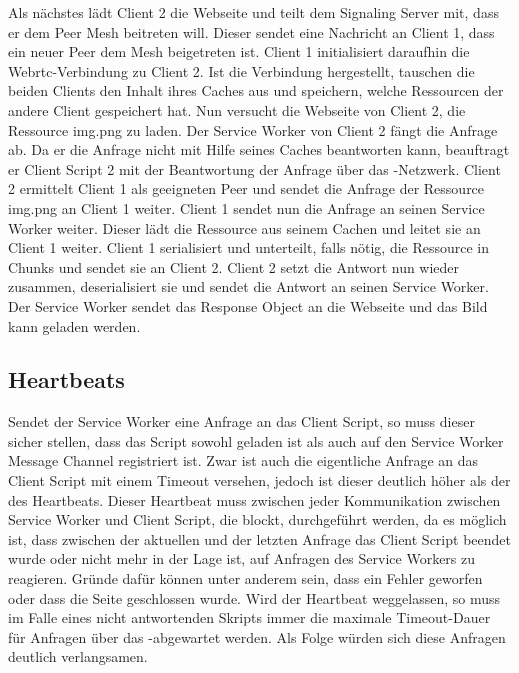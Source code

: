 \begin{description}
Als nächstes lädt Client 2 die Webseite und teilt dem Signaling Server mit, dass er dem Peer Mesh beitreten will. Dieser sendet eine Nachricht an Client 1, dass ein neuer Peer dem Mesh beigetreten ist. Client 1 initialisiert daraufhin die Webrtc-Verbindung zu Client 2. Ist die Verbindung hergestellt, tauschen die beiden Clients den Inhalt ihres Caches aus und speichern, welche Ressourcen der andere Client gespeichert hat. Nun versucht die Webseite von Client 2, die Ressource img.png zu laden. Der Service Worker von Client 2 fängt die Anfrage ab. Da er die Anfrage nicht mit Hilfe seines Caches beantworten kann, beauftragt er Client Script 2 mit der Beantwortung der Anfrage über das \pTp-Netzwerk. Client 2 ermittelt Client 1 als geeigneten Peer und sendet die Anfrage der Ressource img.png an Client 1 weiter. Client 1 sendet nun die Anfrage an seinen Service Worker weiter. Dieser lädt die Ressource aus seinem Cachen und leitet sie an Client 1 weiter. Client 1 serialisiert und unterteilt, falls nötig, die Ressource in Chunks und sendet sie an Client 2. Client 2 setzt die Antwort nun wieder zusammen, deserialisiert sie und sendet die Antwort an seinen Service Worker. Der Service Worker sendet das Response Object an die Webseite und das Bild kann geladen werden.

\subsection{Heartbeats}

Sendet der Service Worker eine Anfrage an das Client Script, so muss dieser sicher stellen, dass das Script sowohl geladen ist als auch auf den Service Worker Message Channel registriert ist. Zwar ist auch die eigentliche Anfrage an das Client Script mit einem Timeout versehen, jedoch ist dieser deutlich höher als der des Heartbeats. Dieser Heartbeat muss zwischen jeder Kommunikation zwischen Service Worker und Client Script, die blockt, durchgeführt werden, da es möglich ist, dass zwischen der aktuellen und der letzten Anfrage das Client Script beendet wurde oder nicht mehr in der Lage ist, auf Anfragen des Service Workers zu reagieren. Gründe dafür können unter anderem sein, dass ein Fehler geworfen oder dass die Seite geschlossen wurde. Wird der Heartbeat weggelassen, so muss im Falle eines nicht antwortenden Skripts immer die maximale Timeout-Dauer für Anfragen über das \pTp-\cdn abgewartet werden. Als Folge würden sich diese Anfragen deutlich verlangsamen.


\end{description}

